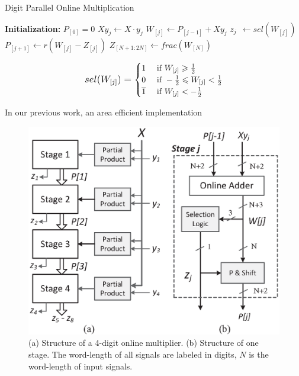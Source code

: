 \documentclass[10pt, conference, compsocconf]{IEEEtran}
\begin{document}
\begin{algorithm}[tbp]
  \caption{Digit Parallel Online Multiplication}\label{Algorithm:OM_DigitParallel}
  \begin{algorithmic}[1]
    \State \textbf{Initialization:} $P_{[0]}=0$                     \vspace{.5ex}
                                           \vspace{.5ex}
        \State $Xy_j \leftarrow X \cdot y_j$                        \vspace{.5ex}
        \State $W_{[j]}    \leftarrow  P_{[j-1]} + Xy_j$            \vspace{.5ex}
        \State $z_{j}  ~~      \leftarrow  sel(W_{[j]})$            \vspace{.5ex}
        \State $P_{[j+1]}  \leftarrow  r\left(W_{[j]}-Z_{[j]}\right)$   \vspace{.5ex}
    \EndFor                                                         \vspace{.5ex}
    \State $Z_{[N+1:2N]} \leftarrow frac(W_{[N]})$                  \vspace{.5ex}
  \end{algorithmic}
  \vspace{-1ex}
\end{algorithm}

\begin{eqnarray}\label{Eq:SelFunc_OM}
\small
  sel(W_{[j]})=\begin{cases}
    1 & \text{ if } W_{[j]} \geqslant \frac{1}{2} \\
    0 & \text{ if } -\frac{1}{2}\leqslant W_{[j]}<\frac{1}{2} \\
    \overline{1} & \text{ if } W_{[j]}<-\frac{1}{2}
  \end{cases}
\normalsize
\end{eqnarray}

In our previous work, an area efficient implementation 

\begin{figure}[tbp]
  \centering
  \includegraphics[width=.42\textwidth]{./figures/ParallelMult_Structure.eps}
  \caption{(a) Structure of a 4-digit online multiplier. (b) Structure of one stage. The word-length of all signals are labeled in digits, $N$ is the word-length of input signals.}
    \vspace{-2ex}
  \label{Fig:PM}
\end{figure}
\end{document}
